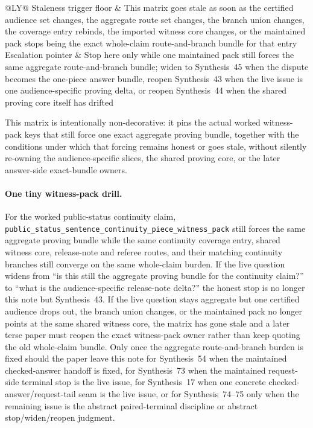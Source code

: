\documentclass[11pt]{article}
\begin{document}
\begin{table}[t]
\begin{tabularx}{\linewidth}{@{}LY@{}}
Staleness trigger floor & This matrix goes stale as soon as the certified audience set changes, the aggregate route set changes, the branch union changes, the coverage entry rebinds, the imported witness core changes, or the maintained pack stops being the exact whole-claim route-and-branch bundle for that entry \\
Escalation pointer & Stop here only while one maintained pack still forces the same aggregate route-and-branch bundle; widen to Synthesis~45 when the dispute becomes the one-piece answer bundle, reopen Synthesis~43 when the live issue is one audience-specific proving delta, or reopen Synthesis~44 when the shared proving core itself has drifted \\
\bottomrule
\end{tabularx}
\caption{A forced public witness-pack matrix. This is the smallest aggregate proving object later terse papers can quote directly when the live issue is whether one maintained pack still forces the same whole-claim route-and-branch burden rather than merely which pack exists in the abstract.}
\label{tab:forced-public-witness-pack-matrix}
\end{table}

This matrix is intentionally non-decorative: it pins the actual worked witness-pack keys that still force one exact aggregate proving bundle, together with the conditions under which that forcing remains honest or goes stale, without silently re-owning the audience-specific slices, the shared proving core, or the later answer-side exact-bundle owners.\cite{series:workedexample}

\paragraph{One tiny witness-pack drill.}
For the worked public-status continuity claim, \nolinkurl{public_status_sentence_continuity_piece_witness_pack} still forces the same aggregate proving bundle while the same continuity coverage entry, shared witness core, release-note and referee routes, and their matching continuity branches still converge on the same whole-claim burden. If the live question widens from ``is this still the aggregate proving bundle for the continuity claim?'' to ``what is the audience-specific release-note delta?'' the honest stop is no longer this note but Synthesis~43. If the live question stays aggregate but one certified audience drops out, the branch union changes, or the maintained pack no longer points at the same shared witness core, the matrix has gone stale and a later terse paper must reopen the exact witness-pack owner rather than keep quoting the old whole-claim bundle. Only once the aggregate route-and-branch burden is fixed should the paper leave this note for Synthesis~54 when the maintained checked-answer handoff is fixed, for Synthesis~73 when the maintained request-side terminal stop is the live issue, for Synthesis~17 when one concrete checked-answer/request-tail seam is the live issue, or for Synthesis~74--75 only when the remaining issue is the abstract paired-terminal discipline or abstract stop/widen/reopen judgment.\cite{series:workedexample}
\end{document}
